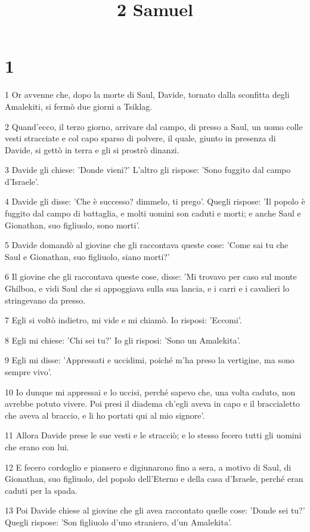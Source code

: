 

\title{2 Samuel}


\chapter{1}

\par 1 Or avvenne che, dopo la morte di Saul, Davide, tornato dalla sconfitta degli Amalekiti, si fermò due giorni a Tsiklag.
\par 2 Quand'ecco, il terzo giorno, arrivare dal campo, di presso a Saul, un uomo colle vesti stracciate e col capo sparso di polvere, il quale, giunto in presenza di Davide, si gettò in terra e gli si prostrò dinanzi.
\par 3 Davide gli chiese: 'Donde vieni?' L'altro gli rispose: 'Sono fuggito dal campo d'Israele'.
\par 4 Davide gli disse: 'Che è successo? dimmelo, ti prego'. Quegli rispose: 'Il popolo è fuggito dal campo di battaglia, e molti uomini son caduti e morti; e anche Saul e Gionathan, suo figliuolo, sono morti'.
\par 5 Davide domandò al giovine che gli raccontava queste cose: 'Come sai tu che Saul e Gionathan, suo figliuolo, siano morti?'
\par 6 Il giovine che gli raccontava queste cose, disse: 'Mi trovavo per caso sul monte Ghilboa, e vidi Saul che si appoggiava sulla sua lancia, e i carri e i cavalieri lo stringevano da presso.
\par 7 Egli si voltò indietro, mi vide e mi chiamò. Io risposi: 'Eccomi'.
\par 8 Egli mi chiese: 'Chi sei tu?' Io gli risposi: 'Sono un Amalekita'.
\par 9 Egli mi disse: 'Appressati e uccidimi, poiché m'ha preso la vertigine, ma sono sempre vivo'.
\par 10 Io dunque mi appressai e lo uccisi, perché sapevo che, una volta caduto, non avrebbe potuto vivere. Poi presi il diadema ch'egli aveva in capo e il braccialetto che aveva al braccio, e li ho portati qui al mio signore'.
\par 11 Allora Davide prese le sue vesti e le stracciò; e lo stesso fecero tutti gli uomini che erano con lui.
\par 12 E fecero cordoglio e piansero e digiunarono fino a sera, a motivo di Saul, di Gionathan, suo figliuolo, del popolo dell'Eterno e della casa d'Israele, perché eran caduti per la spada.
\par 13 Poi Davide chiese al giovine che gli avea raccontato quelle cose: 'Donde sei tu?' Quegli rispose: 'Son figliuolo d'uno straniero, d'un Amalekita'.
